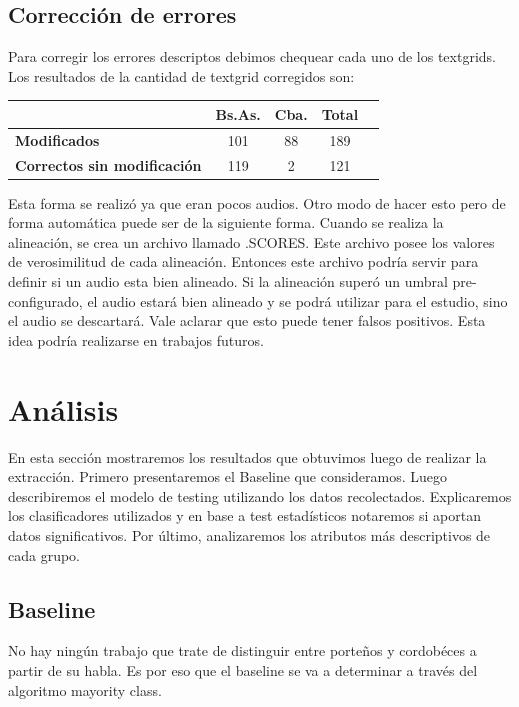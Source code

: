 \documentclass[11pt,a4paper,twoside]{tesis}
\begin{document}
\section{Corrección de errores}

Para corregir los errores descriptos debimos chequear cada uno de los textgrids. Los resultados de la cantidad de textgrid corregidos son:

\begin{table}[h]
\centering
\begin{tabular}{|l|c|c|c|c|}
\hline
\textbf{}  & \textbf{Bs.As. } & \textbf{Cba.} & \textbf{Total} \\ \hline
\textbf{Modificados}  & 101 & 88 & 189 \\ \hline
\textbf{Correctos sin modificación}  & 119 & 2 & 121 \\ \hline
\end{tabular}
\end{table}

Esta forma se realizó ya que eran pocos audios. Otro modo de hacer esto pero de forma automática puede ser de la siguiente forma. Cuando se realiza la alineación, se crea un archivo llamado .SCORES. Este archivo posee los valores de verosimilitud de cada alineación. Entonces este archivo podría servir para definir si un audio esta bien alineado. Si la alineación superó un umbral pre-configurado, el audio estará bien alineado y se podrá utilizar para el estudio, sino el audio se descartará. Vale aclarar que esto puede tener falsos positivos. Esta idea podría realizarse en trabajos futuros.

\chapter{Análisis}

En esta sección mostraremos los resultados que obtuvimos luego de realizar la extracción. Primero presentaremos el Baseline que consideramos. Luego describiremos el modelo de testing utilizando los datos recolectados. Explicaremos los clasificadores utilizados y en base a test estadísticos notaremos si aportan datos significativos. Por último, analizaremos los atributos más descriptivos de cada grupo.

\section{Baseline}

No hay ningún trabajo que trate de distinguir entre porteños y cordobéces a partir de su habla. Es por eso que el baseline se va a determinar a través del algoritmo mayority class.
\end{document}
